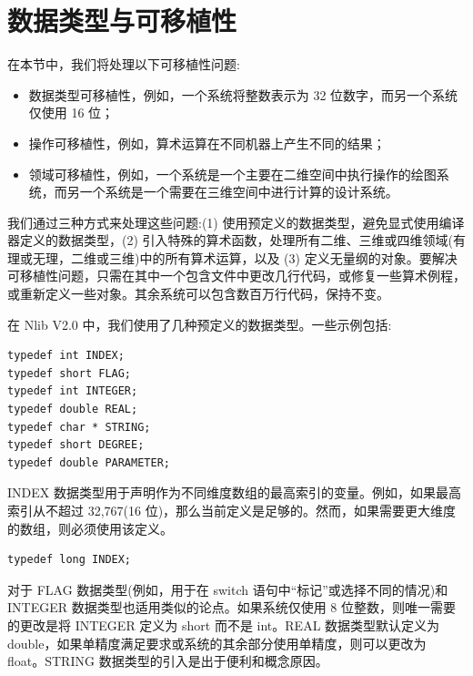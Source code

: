\documentclass[../main.tex]{subfiles}
\begin{document}
\section{数据类型与可移植性}
在本节中，我们将处理以下可移植性问题:

\begin{itemize}
\item 数据类型可移植性，例如，一个系统将整数表示为 32 位数字，而另一个系统仅使用 16 位；
\end{itemize}

\begin{itemize}
\item 操作可移植性，例如，算术运算在不同机器上产生不同的结果；
\end{itemize}

\begin{itemize}
\item 领域可移植性，例如，一个系统是一个主要在二维空间中执行操作的绘图系统，而另一个系统是一个需要在三维空间中进行计算的设计系统。
\end{itemize}

我们通过三种方式来处理这些问题:(1) 使用预定义的数据类型，避免显式使用编译器定义的数据类型，(2) 引入特殊的算术函数，处理所有二维、三维或四维领域(有理或无理，二维或三维)中的所有算术运算，以及 (3) 定义无量纲的对象。要解决可移植性问题，只需在其中一个包含文件中更改几行代码，或修复一些算术例程，或重新定义一些对象。其余系统可以包含数百万行代码，保持不变。

在 Nlib V2.0 中，我们使用了几种预定义的数据类型。一些示例包括:

\begin{verbatim}
typedef int INDEX;
typedef short FLAG;
typedef int INTEGER;
typedef double REAL;
typedef char * STRING;
typedef short DEGREE;
typedef double PARAMETER;
\end{verbatim}

INDEX 数据类型用于声明作为不同维度数组的最高索引的变量。例如，如果最高索引从不超过 32,767(16 位)，那么当前定义是足够的。然而，如果需要更大维度的数组，则必须使用该定义。

\begin{verbatim}
typedef long INDEX;
\end{verbatim}

对于 FLAG 数据类型(例如，用于在 switch 语句中“标记”或选择不同的情况)和 INTEGER 数据类型也适用类似的论点。如果系统仅使用 8 位整数，则唯一需要的更改是将 INTEGER 定义为 short 而不是 int。REAL 数据类型默认定义为 double，如果单精度满足要求或系统的其余部分使用单精度，则可以更改为 float。STRING 数据类型的引入是出于便利和概念原因。
\end{document}
